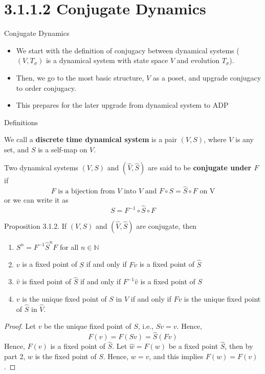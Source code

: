 \section{3.1.1.2 Conjugate Dynamics}
\begin{frame}{Conjugate Dynamics}
\begin{itemize}
    \item We start with the definition of conjugacy between dynamical systems ($(V, T_\sigma)$ is a dynamical system with state space $V$ and evolution $T_\sigma$).
    \item  Then, we go to the most basic structure, $V$ as a poset, and upgrade conjugacy to order conjugacy. 
    \item  This prepares for the later upgrade from dynamical system to ADP
\end{itemize}
\end{frame}
\begin{frame}{Definitions}
\begin{definition}
    We call a \textbf{discrete time dynamical system} is a pair $(V,S)$, where $V$ is any set, and $S$ is a self-map on $V$.
\end{definition}
\begin{definition}
    Two dynamical systems $(V, S)$ and $(\hat V, \hat S)$ are said to be \textbf{conjugate under $F$} if 
    $$
    \text{$F$ is a bijection from $V$ into $\hat V$ and $F\circ S = \hat S \circ F$ on V} 
    $$
    or we can write it as
    $$
    S = F^{-1} \circ \hat S \circ F
    $$
\end{definition}
\end{frame}

\begin{frame}{Proposition 3.1.2.}
    If $(V,S)$ and $(\hat V, \hat S)$ are conjugate, then
    \begin{enumerate}
        \item $S^n = F^{-1} \hat S^n F$ for all $n\in \mathbb{N}$
        \item $v$ is a fixed point of $S$ if and only if $Fv$ is a fixed point of $\hat S$
        \item $\hat v$ is fixed point of $\hat S$ if and only if $F^{-1}\hat v$ is a fixed point of $S$
        \item $v$ is the unique fixed point of $S$ in $V$ if and only if $Fv$ is the unique fixed point of $\hat S$ in $\hat V$.
    \end{enumerate}
    \begin{proof}
        Let $v$ be the unique fixed point of $S$, i.e., $Sv=v$. Hence, 
        $$
        F(v) = F(Sv) = \hat S(Fv)
        $$
        Hence, $F(v)$ is a fixed point of $\hat S$. Let $\hat w = F(w)$ be a fixed point $\hat S$, then by part 2, $w$ is the fixed point of $S$. Hence, $w=v$, and this implies $F(w)= F(v)$.
    \end{proof}
\end{frame}

